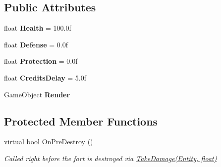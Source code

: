 \subsection*{Public Attributes}
\begin{DoxyCompactItemize}
\item 
\hypertarget{class_skyrates_1_1_entity_1_1_entity_fort_acb9cf3f1dce811412e304c46a1c039bc}{float {\bfseries Health} = 100.\-0f}\label{class_skyrates_1_1_entity_1_1_entity_fort_acb9cf3f1dce811412e304c46a1c039bc}

\item 
\hypertarget{class_skyrates_1_1_entity_1_1_entity_fort_a7e464473f0b4b71baddde97bc84d48a7}{float {\bfseries Defense} = 0.\-0f}\label{class_skyrates_1_1_entity_1_1_entity_fort_a7e464473f0b4b71baddde97bc84d48a7}

\item 
\hypertarget{class_skyrates_1_1_entity_1_1_entity_fort_ae493b6bdf9b5c1340355de00cff1b9c4}{float {\bfseries Protection} = 0.\-0f}\label{class_skyrates_1_1_entity_1_1_entity_fort_ae493b6bdf9b5c1340355de00cff1b9c4}

\item 
\hypertarget{class_skyrates_1_1_entity_1_1_entity_fort_a946a80008fa5b1f05f73aff5b9f6e364}{float {\bfseries Credits\-Delay} = 5.\-0f}\label{class_skyrates_1_1_entity_1_1_entity_fort_a946a80008fa5b1f05f73aff5b9f6e364}

\item 
\hypertarget{class_skyrates_1_1_entity_1_1_entity_fort_a15b197a94944b84c136703f1c1b0db8f}{Game\-Object {\bfseries Render}}\label{class_skyrates_1_1_entity_1_1_entity_fort_a15b197a94944b84c136703f1c1b0db8f}

\end{DoxyCompactItemize}
\subsection*{Protected Member Functions}
\begin{DoxyCompactItemize}
\item 
virtual bool \hyperlink{class_skyrates_1_1_entity_1_1_entity_fort_a28c177ede9ee423bb56c59da4c2f6fe2}{On\-Pre\-Destroy} ()
\begin{DoxyCompactList}\small\item\em Called right before the fort is destroyed via \hyperlink{class_skyrates_1_1_entity_1_1_entity_fort_a1076c0a76bde21b94379feddf047b73c}{Take\-Damage(\-Entity, float)} \end{DoxyCompactList}\end{DoxyCompactItemize}


